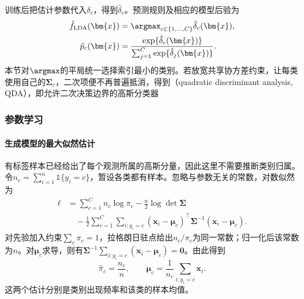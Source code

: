 训练后把估计参数代入$\delta_c$，得到$\hat{\delta}_c$。预测规则及相应的模型后验为
\begin{equation}
  \label{eq:classification-lda-prediction}
  \begin{aligned}
    \hat f_{\mathrm{LDA}}(\bm{x})
      &=\argmax_{c\in\{1,\ldots,C\}}\hat{\delta}_c(\bm{x}),\\
    \hat p_c(\bm{x})
      &=\frac{\exp\{\hat{\delta}_c(\bm{x})\}}
        {\sum_{j=1}^{C}\exp\{\hat{\delta}_j(\bm{x})\}} .
  \end{aligned}
\end{equation}
本节对$\argmax$的平局统一选择索引最小的类别。若放宽共享协方差约束，让每类使用自己的$\bm{\Sigma}_c$，二次项便不再普遍抵消，得到（quadratic discriminant analysis, QDA），即允许二次决策边界的高斯分类器

\subsubsection{参数学习}
\label{sec:classification-lda-learning}

\paragraph{生成模型的最大似然估计}
有标签样本已经给出了每个观测所属的高斯分量，因此这里不需要推断类别归属。令$n_c=\sum_{i=1}^{n}\mathbb{1}\{y_i=c\}$，暂设各类都有样本。忽略与参数无关的常数，对数似然为
\begin{equation}
  \label{eq:classification-lda-likelihood}
  \begin{aligned}
    \ell
      &=\sum_{c=1}^{C}n_c\log\pi_c
        -\frac n2\log\det\bm{\Sigma}\\
      &\quad-\frac12\sum_{c=1}^{C}\sum_{i:y_i=c}
        (\bm{x}_i-\bm{\mu}_c)^{\top}
        \bm{\Sigma}^{-1}(\bm{x}_i-\bm{\mu}_c).
  \end{aligned}
\end{equation}
对先验加入约束$\sum_c\pi_c=1$，拉格朗日驻点给出$n_c/\pi_c$为同一常数；归一化后该常数为$n$。对$\bm{\mu}_c$求导，则有$\bm{\Sigma}^{-1}\sum_{i:y_i=c}(\bm{x}_i-\bm{\mu}_c)=\bm{0}$。由此得到
\begin{equation}
  \label{eq:classification-lda-mean-prior}
  \hat\pi_c=\frac{n_c}{n},\qquad
  \hat{\bm{\mu}}_c=\frac1{n_c}\sum_{i:y_i=c}\bm{x}_i .
\end{equation}
这两个估计分别是类别出现频率和该类的样本均值。

